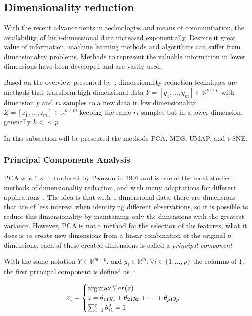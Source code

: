 \subsection{Dimensionality reduction}
%

With the recent advancements in technologies and means of communication, the availability, of high-dimensional data increased exponentially. 
%
Despite it great value of information, machine learning methods and algorithms can suffer from dimensionality problems.
%
Methods to represent the valuable information in lower dimensions have been developed and are vastly used.
%

Based on the overview presented by~\cite{ayesha2020dimensionality}, dimensionality reduction techniques are methods that transform high-dimensional data $Y = [y_1, \dots, y_m] \in \mathbb{R}^{m \times p}$ with dimension $p$ and $m$ samples to a new data in low dimensionality $Z = [z_1, \dots, z_m] \in \mathbb{R}^{k \times m}$ keeping the same $m$ samples but in a lower dimension, generally $k << p$. 
%

In this subsection will be presented the methods PCA, MDS, UMAP, and t-SNE.

\subsubsection{Principal Components Analysis}
%
PCA was first introduced by Pearson in 1901 and is one of the most studied methods of dimensionality reduction, and with many adaptations for different applications~\cite{ayesha2020dimensionality}.
%
The idea is that with p-dimensional data, there are dimensions that are of less interest when identifying different observations, so it is possible to reduce this dimensionality by maintaining only the dimensions with the greatest variance.
%
However, PCA is not a method for the selection of the features, what it does is to create new dimensions from a linear combination of the original $p$ dimensions, each of these created dimensions is called a \textit{principal component}.
%

With the same notation $Y\in \mathbb{R}^{m\times p}$, and $y_i \in \mathbb{R}^m, \forall i \in \{ 1, \dots, p\}$ the columns of $Y$, the first principal component is defined as~\cite{james2013introduction}:

\begin{equation*}
\begin{split}
    z_1 = \begin{cases}
    \operatorname*{arg\,max} Var(z) \\
    z = \theta_{11}y_1 + \theta_{21}y_2 + \dots + \theta_{p1}y_p \\
    \sum_{i=1}^p\theta_{i1}^2 = 1
    \end{cases}
\end{split}
\end{equation*}

